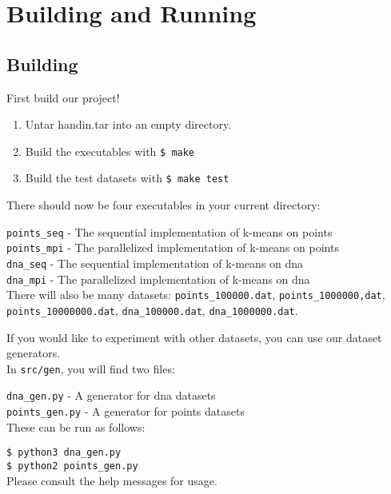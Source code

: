 \documentclass[12pt]{article}
\begin{document}
\section{Building and Running}
 
\subsection{Building}

First build our project!

\begin{enumerate}
\item Untar handin.tar into an empty directory.
\item Build the executables with \texttt{\$ make}
\item Build the test datasets with \texttt{\$ make test}
\end{enumerate}

There should now be four executables in your current directory: 


\texttt{points\_seq} - The sequential implementation of k-means on points \\
\texttt{points\_mpi} - The parallelized implementation of k-means on points \\
\texttt{dna\_seq} - The sequential implementation of k-means on dna \\
\texttt{dna\_mpi} - The parallelized implementation of k-means on dna \\

There will also be many datasets: \texttt{points\_100000.dat},
\texttt{points\_1000000,dat}, \texttt{points\_10000000.dat},
\texttt{dna\_100000.dat}, \texttt{dna\_1000000.dat}.

 If you would like to experiment with other datasets, you can use our dataset generators.\\


 In \texttt{src/gen}, you will find two files: 


 \texttt{dna\_gen.py} - A generator for dna datasets \\
 \texttt{points\_gen.py} - A generator for points datasets \\


 These can be run as follows:


 \texttt{\$ python3 dna\_gen.py} \\
 \texttt{\$ python2 points\_gen.py} \\

 Please consult the help messages for usage.
\end{document}

